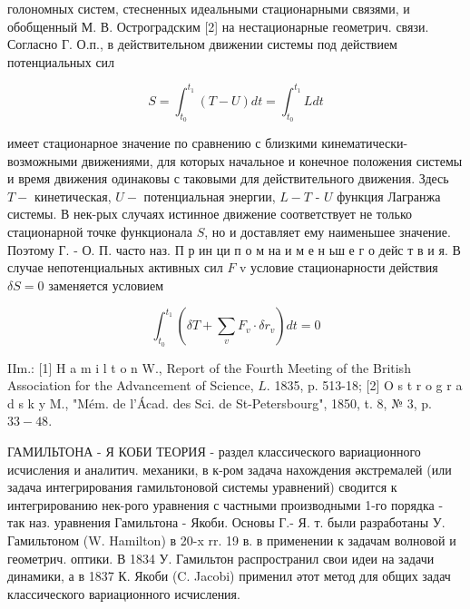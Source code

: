 \documentclass[10pt]{article}
\begin{document}
голономных систем, стесненных идеальными стационарными связями, и обобщенный М. В. Остроградским [2] на нестационарные геометрич. связи. Согласно Г. О.п., в действительном движении системы под действием потенциальных сил



\[

S=\int_{t_{0}}^{t_{1}}(T-U) d t=\int_{t_{0}}^{t_{1}} L d t

\]



имеет стационарное значение по сравнению с близкими кинематически-возможными движениями, для которых начальное и конечное положения системы и время движения одинаковы с таковыми для действительного движения. Здесь $T-$ кинетическая, $U-$ потенциальная энергии, $L-T$ - $U$ функция Лагранжа системы. В нек-рых случаях истинное движение соответствует не только стационарной точке функционала $S$, но и доставляет ему наименьшее значение. Поэтому Г. - О. П. часто наз. П р ин ци п о м на и м е н ьш е г о дейс т в и я. В случае непотенциальных активных сил $F$ v условие стационарности действия $\delta S=0$ заменяется условием



\[

\int_{t_{0}}^{t_{1}}\left(\delta T+\sum_{v} F_{v} \cdot \delta r_{v}\right) d t=0

\]



IIm.: [1] H a m i l t o $\mathrm{n}$ W., Report of the Fourth Meeting of the British Association for the Advancement of Science, $L$. 1835, p. 513-18; [2] O s t r o g r a d s k y M., "Mém. de l'Ácad. des Sci. de St-Petersbourg", 1850, t. 8, № 3, p. $33-48$.



ГАМИЛЬТОНА - Я КОБИ ТЕОРИЯ - раздел классического вариационного исчисления и аналитич. механики, в к-ром задача нахождения әкстремалей (или задача интегрирования гамильтоновой системы уравнений) сводится к интегрированию нек-рого уравнения с частными производными 1-го порядка - так наз. уравнения Гамильтона - Якоби. Основы Г.- Я. т. были разработаны У. Гамильтоном (W. Hamilton) в 20-x rr. 19 в. в применении к задачам волновой и геометрич. оптики. В 1834 У. Гамильтон распространил свои идеи на задачи динамики, а в 1837 К. Якоби (C. Jacobi) применил әтот метод для общих задач классического вариационного исчисления.
\end{document}
